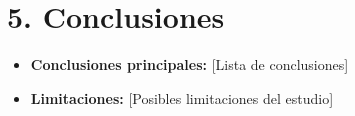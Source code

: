 \documentclass[12pt, a4paper]{article}
\begin{document}
\section*{5. Conclusiones}
\begin{itemize}
    \item \textbf{Conclusiones principales:} [Lista de conclusiones]
    \item \textbf{Limitaciones:} [Posibles limitaciones del estudio]
\end{itemize}
\end{document}
